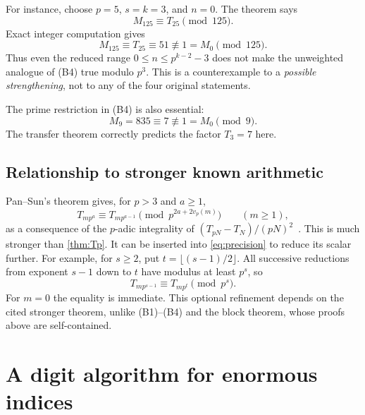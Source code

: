 \documentclass[11pt,a4paper]{article}
\numberwithin{equation}{section}
\theoremstyle{definition}
\theoremstyle{remark}
\begin{document}
For instance, choose $p=5$, $s=k=3$, and $n=0$. The theorem says
\[
 M_{125}\equiv T_{25}\pmod{125}.
\]
Exact integer computation gives
\begin{equation}\label{eq:p3counter}
 M_{125}\equiv T_{25}\equiv51\not\equiv1=M_0\pmod{125}.
\end{equation}
Thus even the reduced range $0\leq n\leq p^{k-2}-3$ does not make
the unweighted analogue of (B4) true modulo $p^3$.
This is a counterexample to a \emph{possible strengthening}, not to any
of the four original statements.

The prime restriction in (B4) is also essential:
\begin{equation}\label{eq:p3failure}
 M_9=835\equiv7\not\equiv1=M_0\pmod9.
\end{equation}
The transfer theorem correctly predicts the factor $T_3=7$ here.

\subsection{Relationship to stronger known arithmetic}
Pan--Sun's theorem gives, for $p>3$ and $a\geq1$,
\[
 T_{mp^a}\equiv T_{mp^{a-1}}\pmod{p^{2a+2v_p(m)}}
 \qquad(m\geq1),
\]
as a consequence of the $p$-adic integrality of
$(T_{pN}-T_N)/(pN)^2$~\cite{panSun}. This is much stronger than
\cref{thm:Tp}. It can be inserted into \eqref{eq:precision} to reduce
its scalar further. For example, for $s\geq2$, put
$t=\lfloor(s-1)/2\rfloor$. All successive reductions from exponent
$s-1$ down to $t$ have modulus at least $p^s$, so
\begin{equation}\label{eq:panrefine}
 T_{mp^{s-1}}\equiv T_{mp^t}\pmod{p^s}.
\end{equation}
For $m=0$ the equality is immediate. This optional refinement depends
on the cited stronger theorem, unlike (B1)--(B4) and the block theorem,
whose proofs above are self-contained.

\section{A digit algorithm for enormous indices}\label{sec:algorithm}
\end{document}
